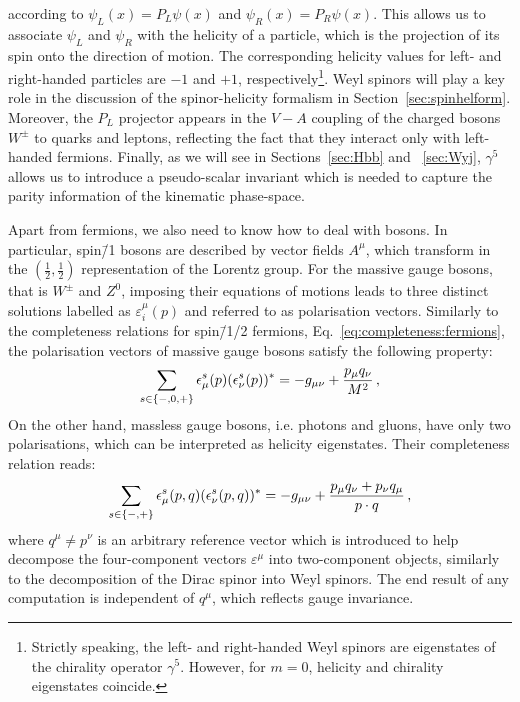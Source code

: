 \documentclass[main.tex]{subfiles}
\begin{document}
according to $\psi_L(x) = P_L\psi(x)$ and $\psi_R(x) = P_R\psi(x)$. This allows us to associate $\psi_L$ and $\psi_R$ with the helicity of a particle, which is the projection of its spin onto the direction of motion. The corresponding helicity values for left- and right-handed particles are $-1$ and $+1$, respectively\footnote{Strictly speaking, the left- and right-handed Weyl spinors are eigenstates of the chirality operator $\gamma^5$. However, for $m=0$, helicity and chirality eigenstates coincide.}. Weyl spinors will play a key role in the discussion of the spinor-helicity formalism in Section~\ref{sec:spinhelform}. Moreover, the $P_L$ projector appears in the $V-A$ coupling of the charged bosons $W^\pm$ to quarks and leptons, reflecting the fact that they interact only with left-handed fermions. Finally, as we will see in Sections~\ref{sec:Hbb} and ~\ref{sec:Wyj}, $\gamma^5$ allows us to introduce a pseudo-scalar invariant which is needed to capture the parity information of the kinematic phase-space. 

Apart from fermions, we also need to know how to deal with bosons. In particular, spin\=/1 bosons are described by vector fields $A^\mu$, which transform in the $(\frac{1}{2}, \frac{1}{2})$ representation of the Lorentz group. For the massive gauge bosons, that is $W^\pm$ and $Z^0$, imposing their equations of motions leads to three distinct solutions labelled as $\varepsilon^\mu_i(p)$ and referred to as polarisation vectors.
Similarly to the completeness relations for spin\=/1/2 fermions, Eq.~\ref{eq:completeness:fermions}, the polarisation vectors of massive gauge bosons satisfy the following property:
\begin{equation}
    \sum_{s \in \{-,0,+\}} \epsilon_\mu^s(p) (\epsilon_\nu^s(p))^{\ast} = -g_{\mu\nu} + \frac{p_\mu q_\nu}{M^2} \,,
\end{equation}
On the other hand, massless gauge bosons, i.e. photons and gluons, have only two polarisations, which can be interpreted as helicity eigenstates. Their completeness relation reads:
\begin{equation} \label{eq:completeness:bosons}
    \sum_{s \in \{-,+\}} \epsilon_\mu^s(p, q) (\epsilon_\nu^s(p, q))^{\ast} = -g_{\mu\nu} + \frac{p_\mu q_\nu + p_\nu q_\mu}{p \cdot q} \,,
\end{equation}
where $q^\mu \neq p^\nu$ is an arbitrary reference vector which is introduced to help decompose the four-component vectors $\varepsilon^\mu$ into two-component objects, similarly to the decomposition of the Dirac spinor into Weyl spinors. The end result of any computation is independent of $q^\mu$, which reflects gauge invariance. 
\end{document}
